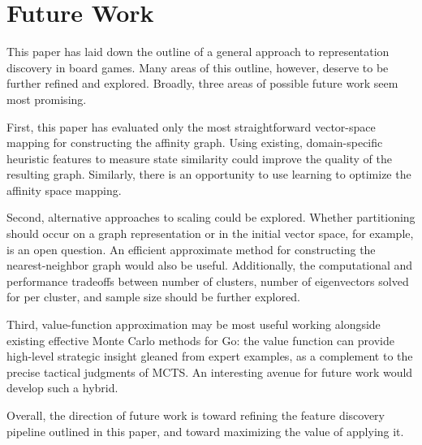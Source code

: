 \section{Future Work}

This paper has laid down the outline of a general approach to representation
discovery in board games. Many areas of this outline, however, deserve to be
further refined and explored. Broadly, three areas of possible future work seem
most promising.

First, this paper has evaluated only the most straightforward vector-space
mapping for constructing the affinity graph. Using existing, domain-specific
heuristic features to measure state similarity could improve the quality of
the resulting graph. Similarly, there is an opportunity to use learning to 
optimize the affinity space mapping.

Second, alternative approaches to scaling could be explored. Whether
partitioning should occur on a graph representation or in the initial vector
space, for example, is an open question. An efficient approximate method for
constructing the nearest-neighbor graph would also be useful. Additionally, the computational and performance tradeoffs between number of 
clusters, number of eigenvectors solved for per cluster, and sample size should
be further explored.

Third, value-function approximation may be most useful working alongside
existing effective Monte Carlo methods for Go: the value function can provide
high-level strategic insight gleaned from expert examples, as a complement to
the precise tactical judgments of MCTS. An interesting avenue for future work
would develop such a hybrid.

Overall, the direction of future work is toward refining 
the feature discovery pipeline outlined in this paper, and toward maximizing the
value of applying it. 


